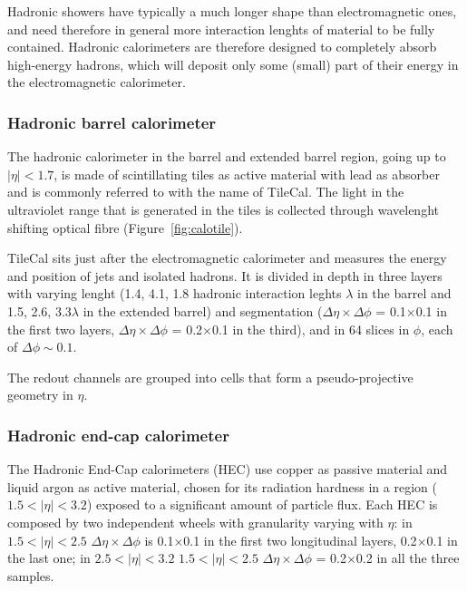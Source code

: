 Hadronic showers have typically a much longer shape than
electromagnetic ones, and need therefore in general more
interaction lenghts of material to be fully contained.
Hadronic calorimeters are therefore designed to completely
absorb high-energy hadrons, which will deposit only some (small) part of their energy 
in the electromagnetic calorimeter.



\subsubsection{Hadronic barrel calorimeter}\label{sec:hadcalbarrel}

The hadronic calorimeter in the barrel and extended barrel region, going up to
$|\eta|<1.7$, is made of scintillating tiles as active material with lead as absorber
and is commonly referred to with the name of TileCal. 
The light in the ultraviolet range that is generated in the tiles is collected through
wavelenght shifting optical fibre (Figure~\ref{fig:calotile}).

TileCal sits just after the electromagnetic
calorimeter and measures the energy and position of jets and isolated hadrons.
It is divided in depth in three layers with varying lenght (1.4, 4.1, 1.8 hadronic interaction
leghts $\lambda$ in the barrel and 1.5, 2.6, 3.3$\lambda$ in the extended barrel) and segmentation
($\Delta\eta\times\Delta\phi$ = 0.1$\times$0.1 in the first two layers,
$\Delta\eta\times\Delta\phi$ = 0.2$\times$0.1 in the third),
and in 64 slices in $\phi$, each of $\Delta\phi\sim0.1$.

The redout channels are grouped into cells that form a pseudo-projective geometry in $\eta$.

\subsubsection{Hadronic end-cap calorimeter}\label{sec:hadcalendcap}

The Hadronic End-Cap calorimeters (HEC) use copper as passive material and liquid
argon as active material, chosen for its radiation hardness in a region ($1.5<|\eta|<3.2$)
exposed to a significant amount of particle flux. Each HEC is composed by
two independent wheels with granularity varying with $\eta$: 
in $1.5<|\eta|<2.5$ $\Delta\eta\times\Delta\phi$ is 0.1$\times$0.1 in the first
two longitudinal layers,  0.2$\times$0.1 in the last one; in
$2.5<|\eta|<3.2$ $1.5<|\eta|<2.5$ $\Delta\eta\times\Delta\phi$ = 0.2$\times$0.2
in all the three samples.


